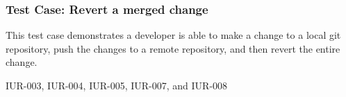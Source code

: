 \subsubsection{Test Case: Revert a merged change}
\begin{description}[align=right,leftmargin=3.2cm,labelindent=3.0cm]
\item[Purpose:] This test case demonstrates a developer is able to make a change to a local git repository, push the changes to a remote repository, and then revert the entire change.
\item[Requirement:] IUR-003, IUR-004, IUR-005, IUR-007, and IUR-008
\end{description}
